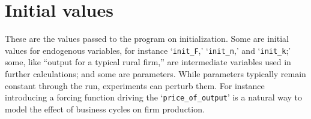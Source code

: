 \chapter{Initial values} \label{appendix-parameters}

These are the values passed to the program on initialization.  Some are initial values for endogenous variables, %
for instance `\texttt{init\_F},' `\texttt{init\_n},' and `\texttt{init\_k};' %
some, like ``output for a typical rural firm,'' are intermediate variables used in further calculations;  %
and some are parameters.  While parameters typically remain constant through the run, experiments can perturb them. For instance introducing a forcing function driving  the `\texttt{price\_of\_output}' is a natural way to model the effect of business cycles on firm production. 
